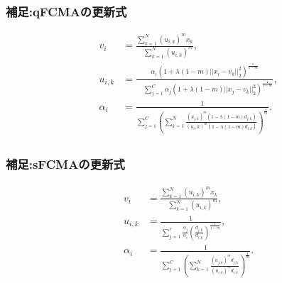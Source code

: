 \documentclass[13pt,dvipdfmx]{beamer}
\begin{document}
\begin{frame}\frametitle{補足:qFCMAの更新式}
  \begin{eqnarray*}
    &v_{i}&=\frac{\sum_{k=1}^N(u_{i,k})^mx_{k}}{\quad\sum_{k=1}^N(u_{i,k})^{m}},\quad\\
    &u_{i,k}&=\frac{\alpha_{i}(1+\lambda(1-m)||x_i-v_k||_2^2)^\frac{1}{1-m}}{\quad\sum_{j=1}^C\alpha_{j}(1+\lambda(1-m)||x_j-v_k||_2^2)^\frac{1}{1-m}},\\
    & \alpha_{i}&=\frac{1}{\sum_{j=1}^C\left(\sum_{k=1}^N\frac{(u_{j,k})^m(1-\lambda(1-m)d_{j,k})}{(u_i,k)^m(1-\lambda(1-m)d_{i,k})}\right)^{\frac{1}{m}}}.\\
  \end{eqnarray*}
\end{frame}

\begin{frame}\frametitle{補足:sFCMAの更新式}
  \begin{eqnarray*}
    &v_{i}&=\frac{\sum_{k=1}^N(u_{i,k})^mx_{k}}{\quad\sum_{k=1}^N(u_{i,k})^{m}},\\
    &u_{i,k}&=\frac{1}{\sum_{j=1}^c\frac{\alpha_{j}}{\alpha_{i}}\left(\frac{d_{j,k}}{d_{i,k}}\right)^\frac{1}{1-m}},\\
    &\alpha_{i}&=\frac{1}{\sum_{j=1}^C\left(\sum_{k=1}^N\frac{(u_{j,k})^md_{j,k}}{(u_{i,k})^md_{i,k}}\right)^{\frac{1}{m}}}.\\
  \end{eqnarray*}
\end{frame}
\end{document}
